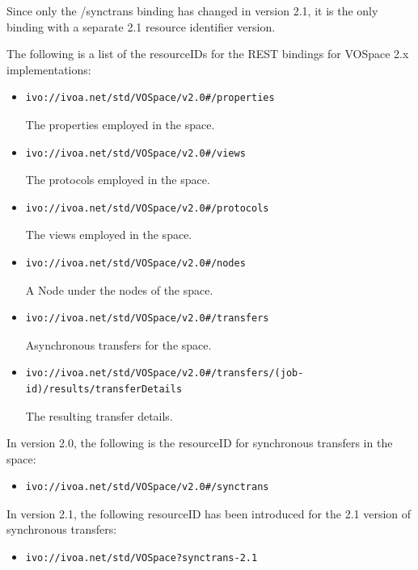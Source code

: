\documentclass[11pt,a4paper]{ivoa}
\begin{document}
Since only the /synctrans binding has changed in version 2.1, it is the only binding with a separate 2.1 resource identifier version.

The following is a list of the resourceIDs for the REST bindings for VOSpace 2.x implementations:

\begin{itemize}
    \item \begin{verbatim}ivo://ivoa.net/std/VOSpace/v2.0#/properties\end{verbatim} The properties employed in the space.
    \item \begin{verbatim}ivo://ivoa.net/std/VOSpace/v2.0#/views\end{verbatim} The protocols employed in the space.
    \item \begin{verbatim}ivo://ivoa.net/std/VOSpace/v2.0#/protocols\end{verbatim} The views employed in the space.
    \item \begin{verbatim}ivo://ivoa.net/std/VOSpace/v2.0#/nodes\end{verbatim} A Node under the nodes of the space.
    \item \begin{verbatim}ivo://ivoa.net/std/VOSpace/v2.0#/transfers\end{verbatim} Asynchronous transfers for the space.
    \item \begin{verbatim}ivo://ivoa.net/std/VOSpace/v2.0#/transfers/(job-id)/results/transferDetails\end{verbatim} The resulting transfer details.
\end{itemize}

In version 2.0, the following is the resourceID for synchronous transfers in the space:

\begin{itemize}
    \item \begin{verbatim}ivo://ivoa.net/std/VOSpace/v2.0#/synctrans\end{verbatim}
\end{itemize}

In version 2.1, the following resourceID has been introduced for the 2.1 version of synchronous transfers:

\begin{itemize}
    \item \begin{verbatim}ivo://ivoa.net/std/VOSpace?synctrans-2.1\end{verbatim}
\end{itemize}
\end{document}
